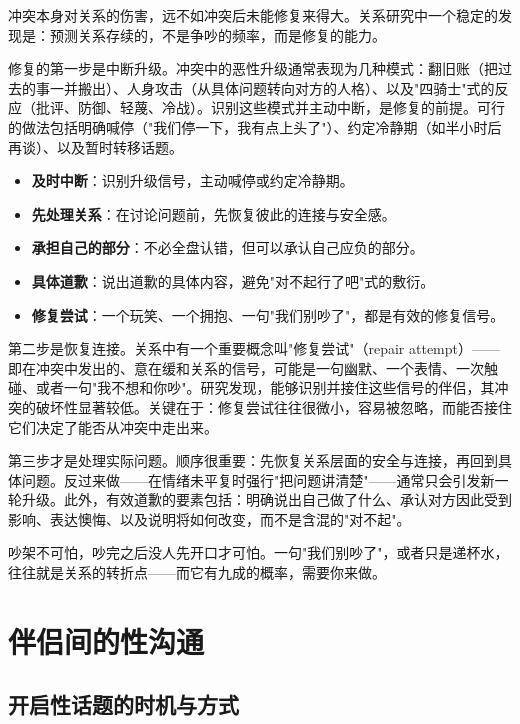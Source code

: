 \documentclass[12pt,UTF8]{ctexbook}
\newcommand{\keyword}[1]{\textbf{#1}}
\begin{document}
冲突本身对关系的伤害，远不如冲突后未能修复来得大。关系研究中一个稳定的发现是：预测关系存续的，不是争吵的频率，而是修复的能力。

修复的第一步是中断升级。冲突中的恶性升级通常表现为几种模式：翻旧账（把过去的事一并搬出）、人身攻击（从具体问题转向对方的人格）、以及"四骑士"式的反应（批评、防御、轻蔑、冷战）。识别这些模式并主动中断，是修复的前提。可行的做法包括明确喊停（"我们停一下，我有点上头了"）、约定冷静期（如半小时后再谈）、以及暂时转移话题。

\begin{itemize}
  \item \keyword{及时中断}：识别升级信号，主动喊停或约定冷静期。
  \item \keyword{先处理关系}：在讨论问题前，先恢复彼此的连接与安全感。
  \item \keyword{承担自己的部分}：不必全盘认错，但可以承认自己应负的部分。
  \item \keyword{具体道歉}：说出道歉的具体内容，避免"对不起行了吧"式的敷衍。
  \item \keyword{修复尝试}：一个玩笑、一个拥抱、一句"我们别吵了"，都是有效的修复信号。
\end{itemize}

第二步是恢复连接。关系中有一个重要概念叫"修复尝试"（repair attempt）——即在冲突中发出的、意在缓和关系的信号，可能是一句幽默、一个表情、一次触碰、或者一句"我不想和你吵"。研究发现，能够识别并接住这些信号的伴侣，其冲突的破坏性显著较低。关键在于：修复尝试往往很微小，容易被忽略，而能否接住它们决定了能否从冲突中走出来。

第三步才是处理实际问题。顺序很重要：先恢复关系层面的安全与连接，再回到具体问题。反过来做——在情绪未平复时强行"把问题讲清楚"——通常只会引发新一轮升级。此外，有效道歉的要素包括：明确说出自己做了什么、承认对方因此受到影响、表达懊悔、以及说明将如何改变，而不是含混的"对不起"。

\begin{tcolorbox}[colback=pink!5!white,colframe=red!50!black,title=贴心小叮咛]
吵架不可怕，吵完之后没人先开口才可怕。一句"我们别吵了"，或者只是递杯水，往往就是关系的转折点——而它有九成的概率，需要你来做。
\end{tcolorbox}

\section{伴侣间的性沟通}
\subsection{开启性话题的时机与方式}
\end{document}
